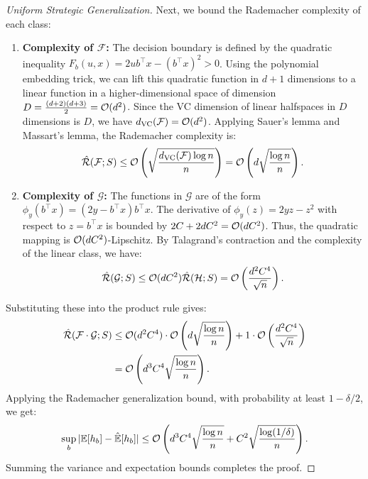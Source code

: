 \begin{proof}[Uniform Strategic Generalization]
Next, we bound the Rademacher complexity of each class:
\begin{enumerate}
    \item \textbf{Complexity of $\mathcal{F}$:} The decision boundary is defined by the quadratic inequality $F_b(u, x) = 2u b^\top x - (b^\top x)^2 > 0$. Using the polynomial embedding trick, we can lift this quadratic function in $d+1$ dimensions to a linear function in a higher-dimensional space of dimension $D = \frac{(d+2)(d+3)}{2} = \mathcal{O}(d^2)$. Since the VC dimension of linear halfspaces in $D$ dimensions is $D$, we have $d_{\mathrm{VC}}(\mathcal{F}) = \mathcal{O}(d^2)$. Applying Sauer's lemma and Massart's lemma, the Rademacher complexity is:
    \begin{equation}
        \hat{\mathcal{R}}(\mathcal{F}; S) \le \mathcal{O}\left( \sqrt{\frac{d_{\mathrm{VC}}(\mathcal{F})\log n}{n}} \right) = \mathcal{O}\left( d\sqrt{\frac{\log n}{n}} \right).
    \end{equation}
    \item \textbf{Complexity of $\mathcal{G}$:} The functions in $\mathcal{G}$ are of the form $\phi_y(b^\top x) = (2y - b^\top x)b^\top x$. The derivative of $\phi_y(z) = 2yz - z^2$ with respect to $z = b^\top x$ is bounded by $2C + 2dC^2 = \mathcal{O}(dC^2)$. Thus, the quadratic mapping is $\mathcal{O}(dC^2)$-Lipschitz. By Talagrand's contraction and the complexity of the linear class, we have:
    \begin{equation}
        \hat{\mathcal{R}}(\mathcal{G}; S) \le \mathcal{O}(dC^2) \hat{\mathcal{R}}(\mathcal{H}; S) = \mathcal{O}\left( \frac{d^2 C^4}{\sqrt{n}} \right).
    \end{equation}
\end{enumerate}
Substituting these into the product rule gives:
\begin{align}
    \hat{\mathcal{R}}(\mathcal{F} \cdot \mathcal{G}; S) &\le \mathcal{O}(d^2 C^4) \cdot \mathcal{O}\left( d\sqrt{\frac{\log n}{n}} \right) + 1 \cdot \mathcal{O}\left( \frac{d^2 C^4}{\sqrt{n}} \right) \nonumber \\
    &= \mathcal{O}\left( d^3 C^4 \sqrt{\frac{\log n}{n}} \right).
    \label{eq:product_class_complexity}
\end{align}
Applying the Rademacher generalization bound, with probability at least $1 - \delta/2$, we get:
\begin{equation}
    \sup_{b} |\mathbb{E}[h_b] - \hat{\mathbb{E}}[h_b]| \le \mathcal{O}\left( d^3 C^4 \sqrt{\frac{\log n}{n}} + C^2\sqrt{\frac{\log(1/\delta)}{n}} \right).
\end{equation}
Summing the variance and expectation bounds completes the proof.
\end{proof}

